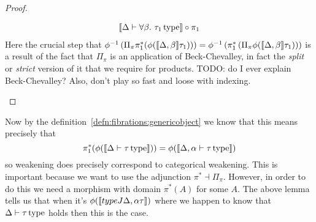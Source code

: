 \begin{proof}
\begin{itemize}
\begin{align*}
      \llbracket \Delta \vdash \forall \beta.\ \tau_1\,\mathrm{type} \rrbracket \circ \pi_1
    \end{align*}
    Here the crucial step that
    $\phi^{-1}\left(\Pi_{\pi} \pi_1^*(\phi(\llbracket \Delta, \beta \rrbracket{\tau_1}))\right) = \phi^{-1}\left(\pi_1^*\left(\Pi_{\pi} \phi(\llbracket \Delta, \beta \rrbracket{\tau_1})\right)\right)$
    is a result of the fact that $\Pi_\pi$ is an application of
    Beck-Chevalley, in fact the \emph{split} or \emph{strict} version
    of it that we require for products. TODO: do I ever explain
    Beck-Chevalley? Also, don't play so fast and loose with indexing.
  \end{itemize}
\end{proof}

Now by the definition~\ref{defn:fibrations:genericobject} we know that
this means precisely that
\[
  \pi_1^*(\phi(\llbracket \Delta \vdash \tau\,\mathrm{type} \rrbracket)) = \phi(\llbracket \Delta, \alpha \vdash \tau\,\mathrm{type} \rrbracket)
\]
so weakening does precisely correspond to categorical weakening. This
is important because we want to use the adjunction
$\pi^* \dashv \Pi_\pi$. However, in order to do this we need a
morphism with domain $\pi^*(A)$ for some $A$. The above lemma tells us
that when it's $\phi(\llbracket typeJ{\Delta, \alpha}{\tau} \rrbracket)$ where we
happen to know that $\Delta \vdash \tau\,\mathrm{type}$ holds then this is the case.

